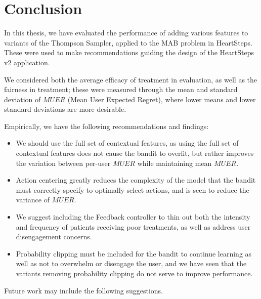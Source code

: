 \chapter{Conclusion}
\label{conclusion}

In this thesis, we have evaluated the performance of adding various features to variants of the Thompson Sampler, applied to the MAB problem in HeartSteps.  These were used to make recommendations guiding the design of the HeartSteps v2 application.  

We considered both the average efficacy of treatment in evaluation, as well as the fairness in treatment; these were measured through the mean and standard deviation of $MUER$ (Mean User Expected Regret), where lower means and lower standard deviations are more desirable.  

Empirically, we have the following recommendations and findings:

\begin{itemize}
	\item We should use the full set of contextual features, as using the full set of contextual features does not cause the bandit to overfit, but rather improves the variation between per-user $MUER$ while maintaining mean $MUER$.
	\item Action centering greatly reduces the complexity of the model that the bandit must correctly specify to optimally select actions, and is seen to reduce the variance of $MUER$. 
	\item We suggest including the Feedback controller to thin out both the intensity and frequency of patients receiving poor treatments, as well as address user disengagement concerns.
	\item Probability clipping must be included for the bandit to continue learning as well as not to overwhelm or disengage the user, and we have seen that the variants removing probability clipping do not serve to improve performance.
\end{itemize}

Future work may include the following suggestions.

